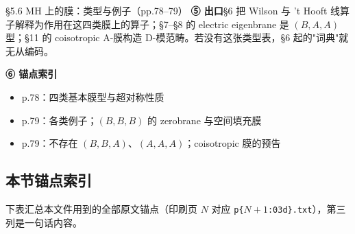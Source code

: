\begin{kcard}{§5.6 MH 上的膜：类型与例子（pp.78--79）}
\noindent\textbf{⑤ 出口}\quad \S6 把 Wilson 与 't Hooft 线算子解释为作用在这四类膜上的算子；\S7--\S8 的 electric eigenbrane 是 $(B,A,A)$ 型；\S11 的 coisotropic A-膜构造 D-模范畴。若没有这张类型表，\S6 起的"词典"就无从编码。\pB{}

\noindent\textbf{⑥ 锚点索引}\quad
\begin{itemize}
\item p.78：四类基本膜型与超对称性质
\item p.79：各类例子；$(B,B,B)$ 的 zerobrane 与空间填充膜
\item p.79：不存在 $(B,B,A)$、$(A,A,A)$；coisotropic 膜的预告
\end{itemize}
\end{kcard}

\noindent{}

\noindent{}

\subsection*{本节锚点索引}

下表汇总本文件用到的全部原文锚点（印刷页 $N$ 对应 \texttt{p\{$N+1$:03d\}.txt}），第三列是一句话内容。

